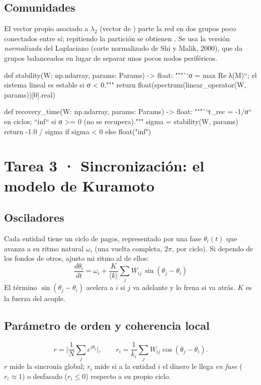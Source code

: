 \section{Comunidades}
El vector propio asociado a $\lambda_2$ (vector de ) parte la red en dos
grupos poco conectados entre sí; repitiendo la partición se obtienen
. Se usa la versión \emph{normalizada} del Laplaciano (corte
normalizado de Shi y Malik, 2000), que da grupos balanceados en lugar de separar
unos pocos nodos periféricos.

\begin{codigo}[label=src/pulso/spectral.py]
def stability(W: np.ndarray, params: Params) -> float:
    """``σ = max Re λ(M)``; el sistema lineal es estable si σ < 0."""
    return float(spectrum(linear_operator(W, params))[0].real)

def recovery_time(W: np.ndarray, params: Params) -> float:
    """``τ_rec = -1/σ`` en ciclos; ``inf`` si σ >= 0 (no se recupera)."""
    sigma = stability(W, params)
    return -1.0 / sigma if sigma < 0 else float("inf")
\end{codigo}

\chapter{Tarea 3 · Sincronización: el modelo de Kuramoto}

\section{Osciladores}
Cada entidad tiene un ciclo de pagos, representado por una fase $\theta_i(t)$ que
avanza a su ritmo natural $\omega_i$ (una vuelta completa, $2\pi$, por ciclo). Si
dependo de los fondos de otros, ajusto mi ritmo al de ellos:
\[
\boxed{\;\frac{d\theta_i}{dt} = \omega_i + \frac{K}{\langle k\rangle}\sum_j W_{ij}\,
\sin(\theta_j-\theta_i)\;}
\]
El término $\sin(\theta_j-\theta_i)$ acelera a $i$ si $j$ va adelante y lo frena si va
atrás. $K$ es la fuerza del acople.

\section{Parámetro de orden y coherencia local}
\[
r = \Big|\frac1N\sum_j e^{i\theta_j}\Big|,\qquad
r_i = \frac{1}{k_i}\sum_j W_{ij}\cos(\theta_j-\theta_i).
\]
$r$ mide la sincronía global; $r_i$ mide si a la entidad $i$ el dinero le llega
\emph{en fase} ($r_i\approx1$) o desfasado ($r_i\le0$) respecto a su propio ciclo.

